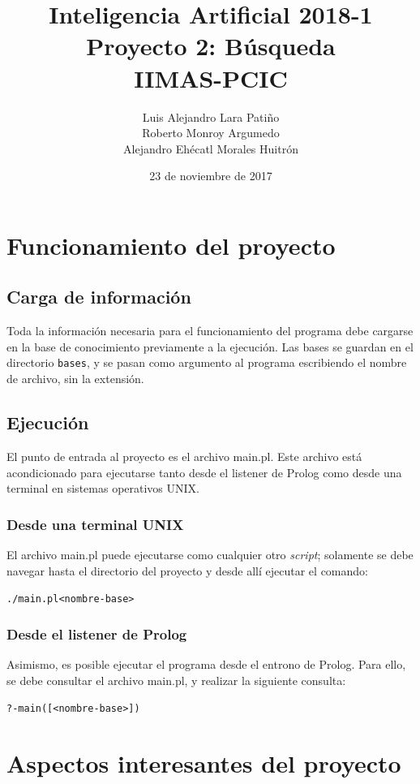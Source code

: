 \documentclass[11pt]{article}
\title{Inteligencia Artificial 2018-1 \\ Proyecto 2: Búsqueda\\
\vspace{2mm}
\small{IIMAS-PCIC}}
\author{Luis Alejandro Lara Patiño\\Roberto Monroy Argumedo\\
Alejandro Ehécatl Morales Huitrón}
\date{23 de noviembre de 2017}
\newcommand{\bt}{\begin{alltt}}
\newcommand{\et}{\end{alltt}}
\begin{document}
\maketitle

\tableofcontents

\section{Funcionamiento del proyecto}

\subsection{Carga de información}
Toda la información necesaria para el funcionamiento del programa debe cargarse en la base de conocimiento previamente a la ejecución. Las bases se guardan en el directorio \texttt{bases}, y se pasan como argumento al programa escribiendo el nombre de archivo, sin la extensión.

\subsection{Ejecución}

El punto de entrada al proyecto es el archivo main.pl. Este archivo está acondicionado para ejecutarse tanto desde el listener de Prolog como desde una terminal en sistemas operativos UNIX.

\subsubsection{Desde una terminal UNIX}
El archivo main.pl puede ejecutarse como cualquier otro \textit{script}; solamente se debe navegar hasta el directorio del proyecto y desde allí ejecutar el comando:

\bt
    ./main.pl <nombre-base>
\et

\subsubsection{Desde el listener de Prolog}
Asimismo, es posible ejecutar el programa desde el entrono de Prolog. Para ello, se debe consultar el archivo main.pl, y realizar la siguiente consulta:

\bt
    ?- main([<nombre-base>])
\et

\section{Aspectos interesantes del proyecto}
\end{document}
